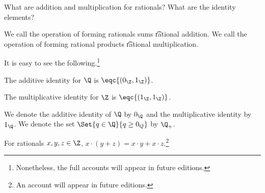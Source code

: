 

What are addition and multiplication for rationals?
What are the identity elements?


We call the operation of forming rationals sums \t{rational addition}.
We call the operation of forming rational products \t{rational multiplication}.


It is easy to see the following.\footnote{Nonetheless, the full accounts will appear in future editions.}

\begin{proposition}
  The additive identity for $\Q$ is $\eqc{(0_{\Z}, 1_{\Z})}$.
\end{proposition}

\begin{proposition}
  The multiplicative identity for $\Z$ is $\eqc{(1_{\Z}, 1_{\Z})}$.
\end{proposition}


We denote the additive identity of $\Q$ by $0_{\Q}$ and the multiplicative identity by $1_{\Q}$.
We denote the set $\Set{q \in \Q}{q \geq 0_{Q}}$ by $\Q_{+}$.


\begin{proposition}
  For rationals $x, y, z \in \Z$, $x \cdot (y + z) = x\cdot y + x\cdot z$.\footnote{An account will appear in future editions.}
\end{proposition}

\blankpage
